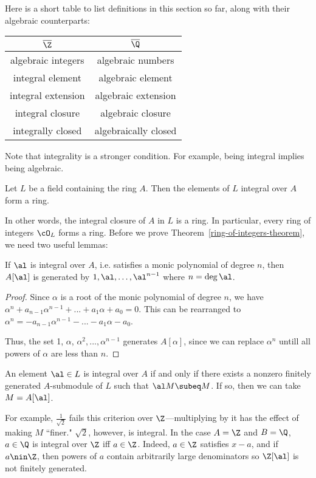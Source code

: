 \noindent Here is a short table to list definitions in this section so far, along with their algebraic counterparts:

\begin{center}
  \begin{tabular}{ c | c }
    $\overline\Z$ & $\overline\Q$ \\ \hline
    algebraic integers & algebraic numbers \\ \hline
    integral element & algebraic element \\ \hline
    integral extension & algebraic extension \\ \hline
    integral closure & algebraic closure \\ \hline
    integrally closed & algebraically closed
  \end{tabular}
\end{center}

\noindent Note that integrality is a stronger condition. For example, being integral implies being algebraic.

\begin{thm}
Let $L$ be a field containing the ring $A$. Then the elements of $L$ integral over $A$ form a ring.
\end{thm}

\noindent In other words, the integral closure of $A$ in $L$ is a ring. In particular, every ring of integers $\cO_L$ forms a ring.
Before we prove Theorem~\ref{ring-of-integers-theorem}, we need two useful lemmas:

\begin{lem}
If $\al$ is integral over $A$, i.e. satisfies a monic polynomial of degree $n$, then $A[\al]$ is generated by $1,\al,\ldots, \al^{n-1}$ where $n = \deg \al$.
\end{lem}
\begin{proof}
Since $\alpha$ is a root of the monic polynomial of degree $n$, we have $\alpha^n + a_{n-1}\alpha^{n-1} + ... + a_1\alpha + a_0 = 0$. This can be rearranged to $\alpha^n = -a_{n-1}\alpha^{n-1} - ... - a_1\alpha - a_0$.

\noindent Thus, the set 1, $\alpha$, $\alpha^2, ..., \alpha^{n-1}$ generates $A[\alpha]$, since we can replace $\alpha^n$ untill all powers of $\alpha$ are less than $n$.
\end{proof}

\begin{lem}
An element $\al\in L$ is integral over $A$ if and only if there exists a nonzero finitely generated $A$-submodule of $L$ such that $\al M\subeq M$. If so, then we can take $M=A[\al]$.
\end{lem}
\begin{ex}
For example, $\frac{1}{\sqrt2}$ fails this criterion over $\Z$---multiplying by it has the effect of making $M$ ``finer." $\sqrt{2}$, however, is integral. In the case $A=\Z$ and $B=\Q$, $a\in \Q$ is integral over $\Z$ iff $a\in \Z$. Indeed, $a\in \Z$ satisfies $x-a$, and if $a\nin \Z$, then powers of $a$ contain arbitrarily large denominators so $\Z[\al]$ is not finitely generated.
\end{ex}

